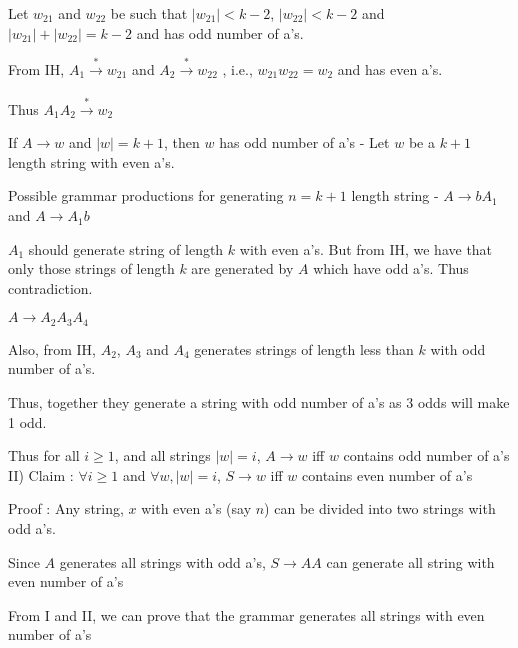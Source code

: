 \documentclass{article}
\begin{document}
    \qquad Let $w_{21}$ and $w_{22}$ be such that $|w_{21}| < k-2$, $|w_{22}| < k-2 $ and $|w_{21}| + |w_{22}| = k-2$ and has odd number of a's.
    
    \qquad From IH, $A_{1} \xrightarrow[]{*} w_{21}$ and $A_{2} \xrightarrow[]{*} w_{22}$ , i.e.,  $w_{21}w_{22} = w_{2}$ and has even a's.
    
    \qquad Thus $A_{1}A_{2} \xrightarrow{*} w_{2}$
    
    \qquad If $A \rightarrow w$ and $|w| = k+1$, then $w$ has odd number of a's -   Let $w$ be a $k+1$ length string with even a's. 
    
    \qquad Possible grammar productions for generating $n = k+1$ length string - $A \rightarrow bA_{1} $ and $A \rightarrow A_{1}b $
    
    \qquad $A_{1}$ should generate string of length $k$ with even a's. But from IH, we have that only those strings of length $k$ are generated by $A$ which have odd a's. Thus contradiction. 

    \qquad$A \rightarrow A_{2}A_{3}A_{4} $
    
    \qquad Also, from IH, $A_{2}$, $A_{3}$ and $A_{4}$ generates strings of length less than $k$ with odd number of a's. 
    
    \qquad Thus, together they generate a string with odd number of a's as 3 odds will make 1 odd.
     
    \quad Thus for all $i \geq 1$, and all strings $|w| = i$, $A \rightarrow w$ iff $w$ contains odd number of a's\\

    II) Claim :  $\forall i \geq 1$ and $\forall w, |w| = i$, $S \rightarrow w$ iff $w$ contains even number of a's
    
    \quad Proof : Any string, $x$ with even a's (say $n$) can be divided into two strings with odd a's.
    
    \quad Since $A$ generates all strings with odd a's, $S \rightarrow AA$ can generate all string with even number of a's
    
    From I and II, we can prove that the grammar generates all strings with even number of a's
    
\end{document}
